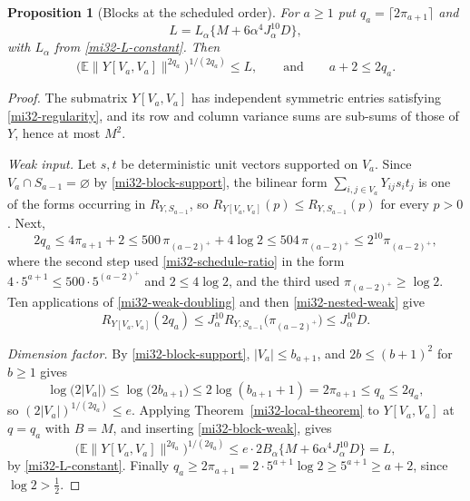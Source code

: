 \documentclass[11pt]{article}
\newtheorem{proposition}[theorem]{Proposition}
\theoremstyle{definition}
\theoremstyle{remark}
\newcommand{\E}{\mathbb E}
\newcommand{\norm}[1]{\lVert#1\rVert}
\begin{document}
\begin{proposition}[Blocks at the scheduled order]
\label{mi32-block-proposition}
For $a\ge1$ put $q_a=\lceil2\pi_{a+1}\rceil$ and
\begin{equation}\label{mi32-block-bound-constant}
 L=L_\alpha\bigl\{M+6\alpha^4J_\alpha^{10}D\bigr\},
\end{equation}
with $L_\alpha$ from \eqref{mi32-L-constant}. Then
\begin{equation}\label{mi32-block-bound}
 \bigl(\E\norm{Y[V_a,V_a]}^{2q_a}\bigr)^{1/(2q_a)}\le L,
 \qquad\text{and}\qquad
 a+2\le2q_a .
\end{equation}
\end{proposition}
\begin{proof}
The submatrix $Y[V_a,V_a]$ has independent symmetric entries satisfying
\eqref{mi32-regularity}, and its row and column variance sums are
sub-sums of those of $Y$, hence at most $M^2$.

\emph{Weak input.} Let $s,t$ be deterministic unit vectors supported on
$V_a$. Since $V_a\cap S_{a-1}=\varnothing$ by
\eqref{mi32-block-support}, the bilinear form $\sum_{i,j\in
V_a}Y_{ij}s_it_j$ is one of the forms occurring in
$R_{Y,S_{a-1}}$, so
$R_{Y[V_a,V_a]}(p)\le R_{Y,S_{a-1}}(p)$ for every $p>0$. Next,
\[
 2q_a\le4\pi_{a+1}+2
    \le500\,\pi_{(a-2)^+}+4\log2
    \le504\,\pi_{(a-2)^+}
    \le2^{10}\pi_{(a-2)^+},
\]
where the second step used \eqref{mi32-schedule-ratio} in the form
$4\cdot5^{a+1}\le500\cdot5^{(a-2)^+}$ and $2\le4\log2$, and the third
used $\pi_{(a-2)^+}\ge\log2$. Ten applications of
\eqref{mi32-weak-doubling} and then \eqref{mi32-nested-weak} give
\begin{equation}\label{mi32-block-weak}
 R_{Y[V_a,V_a]}(2q_a)
 \le J_\alpha^{10}R_{Y,S_{a-1}}\bigl(\pi_{(a-2)^+}\bigr)
 \le J_\alpha^{10}D .
\end{equation}

\emph{Dimension factor.} By \eqref{mi32-block-support},
$|V_a|\le b_{a+1}$, and $2b\le(b+1)^2$ for $b\ge1$ gives
\[
 \log\bigl(2|V_a|\bigr)\le\log\bigl(2b_{a+1}\bigr)
 \le2\log(b_{a+1}+1)=2\pi_{a+1}\le q_a\le2q_a ,
\]
so $(2|V_a|)^{1/(2q_a)}\le e$. Applying
Theorem~\ref{mi32-local-theorem} to $Y[V_a,V_a]$ at $q=q_a$ with
$B=M$, and inserting \eqref{mi32-block-weak}, gives
\[
 \bigl(\E\norm{Y[V_a,V_a]}^{2q_a}\bigr)^{1/(2q_a)}
 \le e\cdot2B_\alpha\bigl\{M+6\alpha^4J_\alpha^{10}D\bigr\}=L,
\]
by \eqref{mi32-L-constant}. Finally $q_a\ge2\pi_{a+1}
=2\cdot5^{a+1}\log2\ge5^{a+1}\ge a+2$, since $\log2>\tfrac12$.
\end{proof}
\end{document}
